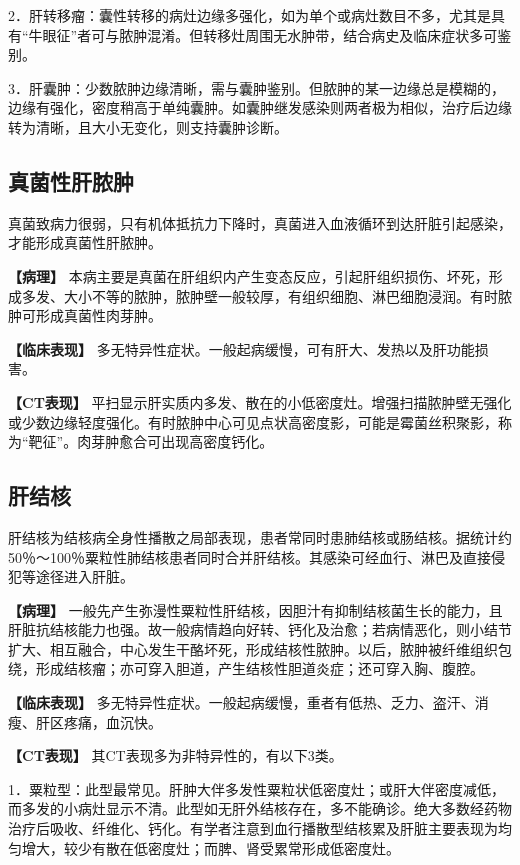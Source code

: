 2．肝转移瘤：囊性转移的病灶边缘多强化，如为单个或病灶数目不多，尤其是具有“牛眼征”者可与脓肿混淆。但转移灶周围无水肿带，结合病史及临床症状多可鉴别。

3．肝囊肿：少数脓肿边缘清晰，需与囊肿鉴别。但脓肿的某一边缘总是模糊的，边缘有强化，密度稍高于单纯囊肿。如囊肿继发感染则两者极为相似，治疗后边缘转为清晰，且大小无变化，则支持囊肿诊断。

\subsection{真菌性肝脓肿}

真菌致病力很弱，只有机体抵抗力下降时，真菌进入血液循环到达肝脏引起感染，才能形成真菌性肝脓肿。

\textbf{【病理】}
本病主要是真菌在肝组织内产生变态反应，引起肝组织损伤、坏死，形成多发、大小不等的脓肿，脓肿壁一般较厚，有组织细胞、淋巴细胞浸润。有时脓肿可形成真菌性肉芽肿。

\textbf{【临床表现】}
多无特异性症状。一般起病缓慢，可有肝大、发热以及肝功能损害。

\textbf{【CT表现】}
平扫显示肝实质内多发、散在的小低密度灶。增强扫描脓肿壁无强化或少数边缘轻度强化。有时脓肿中心可见点状高密度影，可能是霉菌丝积聚影，称为“靶征”。肉芽肿愈合可出现高密度钙化。

\subsection{肝结核}

肝结核为结核病全身性播散之局部表现，患者常同时患肺结核或肠结核。据统计约50％～100％粟粒性肺结核患者同时合并肝结核。其感染可经血行、淋巴及直接侵犯等途径进入肝脏。

\textbf{【病理】}
一般先产生弥漫性粟粒性肝结核，因胆汁有抑制结核菌生长的能力，且肝脏抗结核能力也强。故一般病情趋向好转、钙化及治愈；若病情恶化，则小结节扩大、相互融合，中心发生干酪坏死，形成结核性脓肿。以后，脓肿被纤维组织包绕，形成结核瘤；亦可穿入胆道，产生结核性胆道炎症；还可穿入胸、腹腔。

\textbf{【临床表现】}
多无特异性症状。一般起病缓慢，重者有低热、乏力、盗汗、消瘦、肝区疼痛，血沉快。

\textbf{【CT表现】} 其CT表现多为非特异性的，有以下3类。

1．粟粒型：此型最常见。肝肿大伴多发性粟粒状低密度灶；或肝大伴密度减低，而多发的小病灶显示不清。此型如无肝外结核存在，多不能确诊。绝大多数经药物治疗后吸收、纤维化、钙化。有学者注意到血行播散型结核累及肝脏主要表现为均匀增大，较少有散在低密度灶；而脾、肾受累常形成低密度灶。

